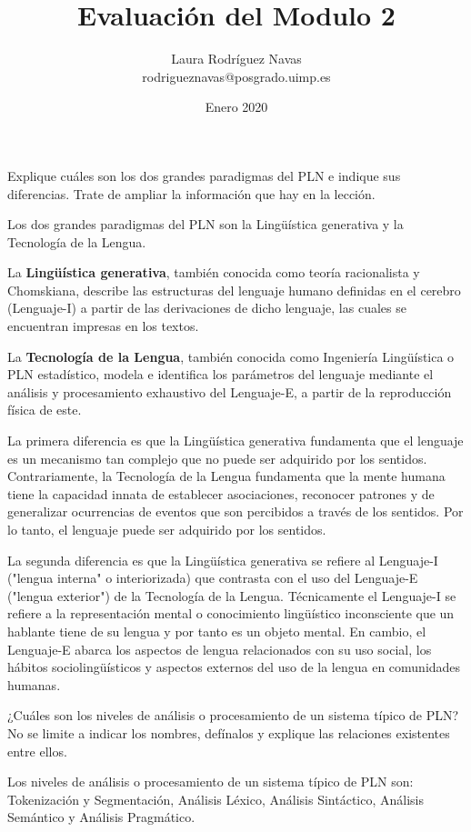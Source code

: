 \documentclass[11pt]{exam}
\title{Evaluación del Modulo 2}
\author{Laura Rodríguez Navas \\ rodrigueznavas@posgrado.uimp.es}
\date{Enero 2020}
\begin{document}
\maketitle

\begin{questions}
	
\question Explique cuáles son los dos grandes paradigmas del PLN e indique sus diferencias. Trate de ampliar la información que hay en la lección.

Los dos grandes paradigmas del PLN son la Lingüística generativa y la Tecnología de la Lengua.

La {\bf Lingüística generativa}, también conocida como teoría racionalista y Chomskiana, describe las estructuras del lenguaje humano definidas en el cerebro (Lenguaje-I) a partir de las derivaciones de dicho lenguaje, las cuales se encuentran
impresas en los textos.
	
La {\bf Tecnología de la Lengua}, también conocida como Ingeniería Lingüística o PLN estadístico, modela e identifica los parámetros del lenguaje mediante el análisis y procesamiento exhaustivo del Lenguaje-E, a partir de la reproducción física de este.

La primera diferencia es que la Lingüística generativa fundamenta que el lenguaje es un mecanismo tan complejo que no puede ser adquirido por los sentidos. Contrariamente, la Tecnología de la Lengua fundamenta que la mente humana tiene la capacidad innata de establecer asociaciones, reconocer patrones y de generalizar ocurrencias de eventos que son percibidos a través de los sentidos. Por lo tanto, el lenguaje puede ser adquirido por los sentidos.

La segunda diferencia es que la Lingüística generativa se refiere al Lenguaje-I ("lengua interna" o interiorizada) que contrasta con el uso del Lenguaje-E ("lengua exterior") de la Tecnología de la Lengua. Técnicamente el Lenguaje-I se refiere a la representación mental o conocimiento lingüístico inconsciente que un hablante tiene de su lengua y por tanto es un objeto mental. En cambio, el Lenguaje-E abarca los aspectos de lengua relacionados con su uso social, los hábitos sociolingüísticos y aspectos externos del uso de la lengua en comunidades humanas. 

\question ¿Cuáles son los niveles de análisis o procesamiento de un sistema típico de PLN? No se limite a indicar los nombres, defínalos y explique las relaciones existentes entre ellos.

Los niveles de análisis o procesamiento de un sistema típico de PLN son: Tokenización y Segmentación, Análisis Léxico, Análisis Sintáctico, Análisis Semántico y Análisis Pragmático.


\end{questions}
\end{document}

